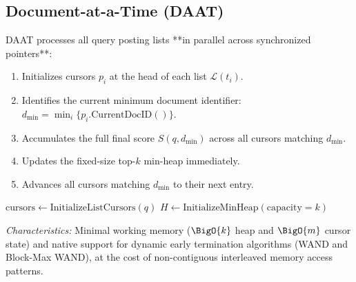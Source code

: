 \subsection{Document-at-a-Time (DAAT)}
DAAT processes all query posting lists **in parallel across synchronized pointers**:
\begin{enumerate}
    \item Initializes cursors $p_i$ at the head of each list $\mathcal{L}(t_i)$.
    \item Identifies the current minimum document identifier: $d_{\min} = \min_{i} \{p_i.\text{CurrentDocID}()\}$.
    \item Accumulates the full final score $S(q, d_{\min})$ across all cursors matching $d_{\min}$.
    \item Updates the fixed-size top-$k$ min-heap immediately.
    \item Advances all cursors matching $d_{\min}$ to their next entry.
\end{enumerate}

\begin{algorithm}[H]
\caption{Document-at-a-Time (DAAT)}
\label{alg:daat-en}

$\text{cursors} \gets \text{InitializeListCursors}(q)$\;
$H \gets \text{InitializeMinHeap}(\text{capacity}=k)$\;

\;
\end{algorithm}

\textit{Characteristics:} Minimal working memory ($\BigO{k}$ heap and $\BigO{m}$ cursor state) and native support for dynamic early termination algorithms (WAND and Block-Max WAND), at the cost of non-contiguous interleaved memory access patterns.

